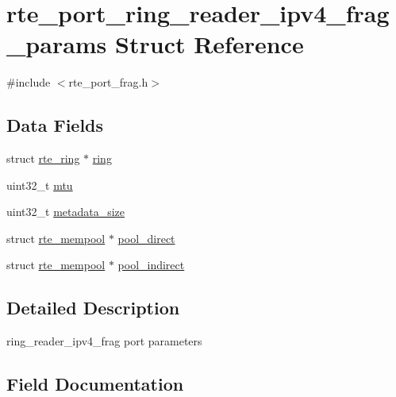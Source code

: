 \hypertarget{structrte__port__ring__reader__ipv4__frag__params}{}\section{rte\+\_\+port\+\_\+ring\+\_\+reader\+\_\+ipv4\+\_\+frag\+\_\+params Struct Reference}
\label{structrte__port__ring__reader__ipv4__frag__params}


{\ttfamily \#include $<$rte\+\_\+port\+\_\+frag.\+h$>$}

\subsection*{Data Fields}
\begin{DoxyCompactItemize}
\item 
struct \hyperlink{structrte__ring}{rte\+\_\+ring} $\ast$ \hyperlink{structrte__port__ring__reader__ipv4__frag__params_a1dfc25cca5a340eff30700b60fd41339}{ring}
\item 
uint32\+\_\+t \hyperlink{structrte__port__ring__reader__ipv4__frag__params_a3c8ee4e9dd2a5354e83fb30c95598f30}{mtu}
\item 
uint32\+\_\+t \hyperlink{structrte__port__ring__reader__ipv4__frag__params_a53192c5a67e697e614b21c797286d09f}{metadata\+\_\+size}
\item 
struct \hyperlink{structrte__mempool}{rte\+\_\+mempool} $\ast$ \hyperlink{structrte__port__ring__reader__ipv4__frag__params_a95aad9924ff3562b4315bb978e4d1ae3}{pool\+\_\+direct}
\item 
struct \hyperlink{structrte__mempool}{rte\+\_\+mempool} $\ast$ \hyperlink{structrte__port__ring__reader__ipv4__frag__params_a0f5522304362b53153955b2712d7b392}{pool\+\_\+indirect}
\end{DoxyCompactItemize}


\subsection{Detailed Description}
ring\+\_\+reader\+\_\+ipv4\+\_\+frag port parameters 

\subsection{Field Documentation}
\hypertarget{structrte__port__ring__reader__ipv4__frag__params_a53192c5a67e697e614b21c797286d09f}{}

